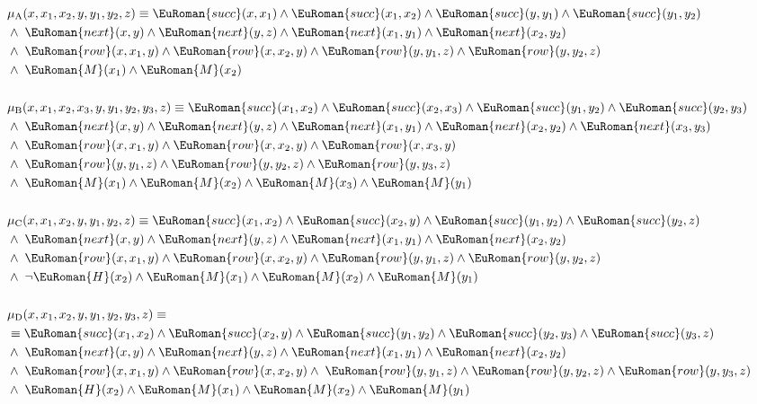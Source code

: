 \documentclass[10pt,a4paper]{amsart}
\theoremstyle{plain}
\theoremstyle{definition}
\numberwithin{equation}{section}
\newcommand{\eurm}[1]{\EuRoman{#1}} %
\newcommand{\rel}[1]{\eurm{#1}} %
\begin{document}
\begin{align}
&\mu_\mathrm{A}(x,x_1,x_2,y,y_1,y_2,z) \equiv \rel{succ}(x,x_1)\wedge\rel{succ}(x_1,x_2)\wedge\rel{succ}(y,y_1)\wedge\rel{succ}(y_1,y_2)\nonumber\\
&\wedge\;\rel{next}(x,y)\wedge\rel{next}(y,z)\wedge\rel{next}(x_1,y_1)\wedge\rel{next}(x_2,y_2)\nonumber\\
&\wedge\;\rel{row}(x,x_1,y)\wedge\rel{row}(x,x_2,y)\wedge\rel{row}(y,y_1,z)\wedge\rel{row}(y,y_2,z)\nonumber\\
&\wedge\;\rel{M}(x_1)\wedge\rel{M}(x_2)\label{eq:marked_a}\\
&\nonumber\\
&\mu_\mathrm{B}(x,x_1,x_2,x_3,y,y_1,y_2,y_3,z) \equiv\rel{succ}(x_1,x_2)\wedge\rel{succ}(x_2,x_3)\wedge\rel{succ}(y_1,y_2)\wedge\rel{succ}(y_2,y_3)\nonumber\\
&\wedge\;\rel{next}(x,y)\wedge\rel{next}(y,z)\wedge\rel{next}(x_1,y_1)\wedge\rel{next}(x_2,y_2)\wedge\rel{next}(x_3,y_3)\nonumber\\
&\wedge\;\rel{row}(x,x_1,y)\wedge\rel{row}(x,x_2,y)\wedge\rel{row}(x,x_3,y)\nonumber\\
&\wedge\;\rel{row}(y,y_1,z)\wedge\rel{row}(y,y_2,z)\wedge\rel{row}(y,y_3,z)\nonumber\\
&\wedge\;\rel{M}(x_1)\wedge\rel{M}(x_2)\wedge\rel{M}(x_3)\wedge\rel{M}(y_1)\label{eq:marked_b}\\
&\nonumber\\
&\mu_\mathrm{C}(x,x_1,x_2,y,y_1,y_2,z) \equiv\rel{succ}(x_1,x_2)\wedge\rel{succ}(x_2,y)\wedge\rel{succ}(y_1,y_2)\wedge\rel{succ}(y_2,z)\nonumber\\
&\wedge\;\rel{next}(x,y)\wedge\rel{next}(y,z)\wedge\rel{next}(x_1,y_1)\wedge\rel{next}(x_2,y_2)\nonumber\\
&\wedge\;\rel{row}(x,x_1,y)\wedge\rel{row}(x,x_2,y)\wedge\rel{row}(y,y_1,z)\wedge\rel{row}(y,y_2,z)\nonumber\\
&\wedge\;\neg\rel{H}(x_2)\wedge\rel{M}(x_1)\wedge\rel{M}(x_2)\wedge\rel{M}(y_1)\label{eq:marked_c}\\
&\nonumber\\
&\mu_\mathrm{D}(x,x_1,x_2,y,y_1,y_2,y_3,z) \equiv\nonumber\\
&\equiv\rel{succ}(x_1,x_2)\wedge\rel{succ}(x_2,y)\wedge\rel{succ}(y_1,y_2)\wedge\rel{succ}(y_2,y_3)\wedge\rel{succ}(y_3,z)\nonumber\\
&\wedge\;\rel{next}(x,y)\wedge\rel{next}(y,z)\wedge\rel{next}(x_1,y_1)\wedge\rel{next}(x_2,y_2)\nonumber\\
&\wedge\;\rel{row}(x,x_1,y)\wedge\rel{row}(x,x_2,y)\wedge\;\rel{row}(y,y_1,z)\wedge\rel{row}(y,y_2,z)\wedge\rel{row}(y,y_3,z)\nonumber\\
&\wedge\;\rel{H}(x_2)\wedge\rel{M}(x_1)\wedge\rel{M}(x_2)\wedge\rel{M}(y_1)\label{eq:marked_d}
\end{align}
\end{document}

